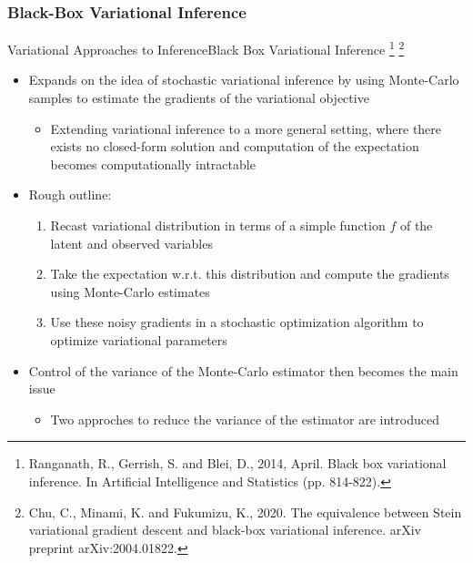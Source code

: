 \documentclass[AERbeamer%
              ,optEnglish%
              ,optBiber%
              ,optBibstyleAlphabetic%
              ,optBeamerClassicFormat%
              ]{AERlatex}%
\begin{document}
\subsubsection*{Black-Box Variational Inference}
\begin{frame}[c]{Variational Approaches to Inference}{Black Box Variational Inference \footnote{Ranganath, R., Gerrish, S. and Blei, D., 2014, April. Black box
                                                                                                variational inference. In Artificial Intelligence and Statistics (pp. 814-822).}
                                                                                      \footnote{Chu, C., Minami, K. and Fukumizu, K., 2020. The equivalence between Stein
                                                                                                variational gradient descent and black-box variational inference. arXiv preprint arXiv:2004.01822.}}
    \centering
    \begin{itemize}
        \item Expands on the idea of stochastic variational inference by using Monte-Carlo samples to estimate the gradients
              of the variational objective
        \begin{itemize}
            \item Extending variational inference to a more general setting, where there exists no closed-form solution and
                  computation of the expectation becomes computationally intractable
        \end{itemize}
        \item Rough outline:
        \begin{enumerate}
            \item Recast variational distribution in terms of a simple function $f$ of the latent and observed variables
            \item Take the expectation w.r.t. this distribution and compute the gradients using Monte-Carlo estimates
            \item Use these noisy gradients in a stochastic optimization algorithm to optimize variational parameters
        \end{enumerate}
        \item Control of the variance of the Monte-Carlo estimator then becomes the main issue
        \begin{itemize}
            \item Two approches to reduce the variance of the estimator are introduced
        \end{itemize}
    \end{itemize}
\end{frame}
\end{document}
